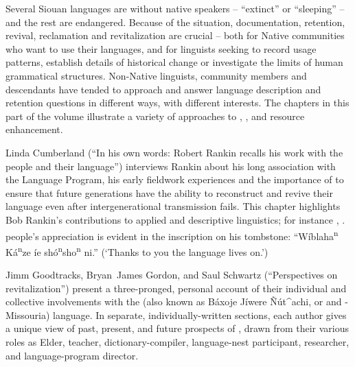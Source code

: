 \begin{refsection}

Several Siouan languages are without native speakers -- ``extinct'' or ``sleeping'' -- and the rest are endangered. Because of the situation, documentation, retention, revival, reclamation and revitalization are crucial -- both for Native communities who want to use their languages, and for linguists seeking to record usage patterns, establish details of historical change or investigate the limits of human grammatical structures. Non-Native linguists, community members and descendants have tended to approach and answer language description and retention questions in different ways, with different interests. The chapters in this part of the volume illustrate a variety of approaches to , , and resource enhancement.

Linda Cumberland (``In his own words: Robert Rankin recalls his work with the  people and their language'') interviews Rankin about his long association with the  Language Program, his early fieldwork experiences and the importance of  to ensure that future generations have the ability to reconstruct and revive their language even after intergenerational transmission fails. This chapter highlights Bob Rankin's contributions to applied and descriptive linguistics; for instance \citet{CumberlandRankin2012}, \citet{Rankin1989}.  people's appreciation is evident in the inscription on his tombstone: ``W\'iblaha\textsuperscript{n} K\'a\textsuperscript{n}ze \'ie sh\'o\textsuperscript{n}sho\textsuperscript{n} ni.'' (`Thanks to you the  language lives on.')

Jimm Goodtracks, Bryan~James Gordon, and Saul Schwartz (``Perspectives on  revitalization'') present a three-pronged, personal account of their individual and collective involvements with the  (also known as Báxoje Jíwere \~{N}út\^{}achi, or  and -Missouria) language. In separate, individually-written sections, each author gives a unique view of past, present, and future prospects of , drawn from their various roles as Elder, teacher, dictionary-compiler, language-nest participant, researcher, and language-program director. 


\end{refsection}
